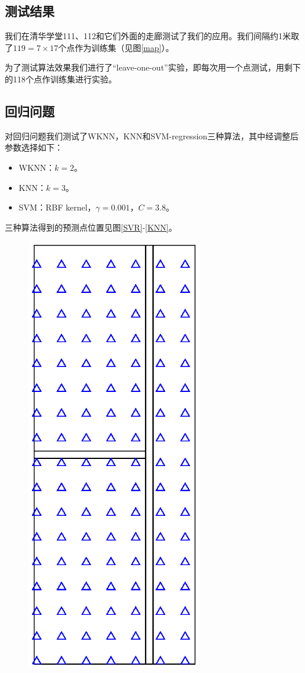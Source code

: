 \documentclass[a4paper,10pt]{article}
\begin{document}
\begin{CJK*}{UTF8}{gbsn}
\section{测试结果}
我们在清华学堂111、112和它们外面的走廊测试了我们的应用。我们间隔约1米取了$119=7\times17$个点作为训练集（见图\eqref{map}）。

为了测试算法效果我们进行了“leave-one-out”实验，即每次用一个点测试，用剩下的118个点作训练集进行实验。

\subsection{回归问题}
对回归问题我们测试了WKNN，KNN和SVM-regression三种算法，其中经调整后参数选择如下：
\begin{itemize}
\item WKNN：$k=2$。
\item KNN：$k=3$。
\item SVM：RBF kernel，$\gamma = 0.001$，$C = 3.8$。
\end{itemize}
三种算法得到的预测点位置见图\eqref{SVR}-\eqref{KNN}。
\begin{figure}[h]
\begin{minipage}[t]{0.5\linewidth}
\centering
\includegraphics[width=3in]{map.eps}

\end{minipage}
\end{figure}
\end{CJK*}
\end{document}
